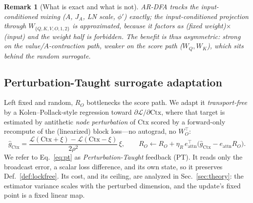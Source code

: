 \documentclass[11pt]{article}
\newtheorem{remark}{Remark}
\newcommand{\ARDFA}{\textsc{AR-DFA}}
\newcommand{\PT}{\textsc{PT}}
\begin{document}
\begin{remark}[What is exact and what is not]
\ARDFA{} tracks the input-conditioned \emph{mixing} ($A$, $J_A$, LN scale, $\phi'$) exactly; the input-conditioned \emph{projection} through $W_{\{Q,K,V,O,1,2\}}$ is approximated, because it factors as (fixed weight)$\times$(input) and the weight half is forbidden. The benefit is thus asymmetric: strong on the value/$A$-contraction path, weaker on the score path ($W_Q,W_K$), which sits behind the random surrogate.
\end{remark}

\subsection{Perturbation-Taught surrogate adaptation}
Left fixed and random, $R_O$ bottlenecks the score path. We adapt it \emph{transport-free} by a Kolen--Pollack-style regression toward $\partial\mathcal L/\partial\mathrm{Ctx}$, where that target is estimated by antithetic \emph{node perturbation} of $\mathrm{Ctx}$ scored by a forward-only recompute of the (linearized) block loss---no autograd, no $W_O^\top$:
\begin{equation}
\hat g_{\mathrm{Ctx}} = \frac{\mathcal L(\mathrm{Ctx}+\xi)-\mathcal L(\mathrm{Ctx}-\xi)}{2\rho^2}\,\xi,\qquad
R_O \leftarrow R_O + \eta_R\, e_{\text{attn}}^\top\big(\hat g_{\mathrm{Ctx}} - e_{\text{attn}} R_O\big). \label{eq:pt}
\end{equation}
We refer to Eq.~\eqref{eq:pt} as \emph{Perturbation-Taught} feedback (\PT). It reads only the broadcast error, a scalar loss difference, and its own state, so it preserves Def.~\ref{def:lockfree}. Its cost, and its ceiling, are analyzed in Sec.~\ref{sec:theory}: the estimator variance scales with the perturbed dimension, and the update's fixed point is a fixed linear map.
\end{document}
